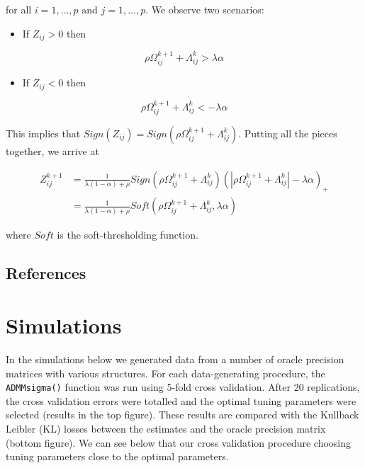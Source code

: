 \documentclass[12pt,]{book}
\providecommand{\tightlist}{%
  \setlength{\itemsep}{0pt}\setlength{\parskip}{0pt}}
\theoremstyle{definition}
\theoremstyle{definition}
\theoremstyle{definition}
\theoremstyle{remark}
\begin{document}
for all \(i = 1,..., p\) and \(j = 1,..., p\). We observe two scenarios:

\begin{itemize}
\tightlist
\item
  If \(Z_{ij} > 0\) then
\end{itemize}

\[ \rho\Omega_{ij}^{k + 1} + \Lambda_{ij}^{k} > \lambda\alpha \]

\begin{itemize}
\tightlist
\item
  If \(Z_{ij} < 0\) then
\end{itemize}

\[ \rho\Omega_{ij}^{k + 1} + \Lambda_{ij}^{k} < -\lambda\alpha \]

This implies that
\(Sign(Z_{ij}) = Sign(\rho\Omega_{ij}^{k + 1} + \Lambda_{ij}^{k})\).
Putting all the pieces together, we arrive at

\begin{align*}
Z_{ij}^{k + 1} &= \frac{1}{\lambda(1 - \alpha) + \rho}Sign\left(\rho\Omega_{ij}^{k + 1} + \Lambda_{ij}^{k}\right)\left( \left| \rho\Omega_{ij}^{k + 1} + \Lambda_{ij}^{k} \right| - \lambda\alpha \right)_{+} \\
&= \frac{1}{\lambda(1 - \alpha) + \rho}Soft\left(\rho\Omega_{ij}^{k + 1} + \Lambda_{ij}^{k}, \lambda\alpha\right)
\end{align*}

where \(Soft\) is the soft-thresholding function.

\newpage

\hypertarget{references}{%
\section{References}\label{references}}

\hypertarget{simulations}{%
\chapter{Simulations}\label{simulations}}

In the simulations below we generated data from a number of oracle
precision matrices with various structures. For each data-generating
procedure, the \texttt{ADMMsigma()} function was run using 5-fold cross
validation. After 20 replications, the cross validation errors were
totalled and the optimal tuning parameters were selected (results in the
top figure). These results are compared with the Kullback Leibler (KL)
losses between the estimates and the oracle precision matrix (bottom
figure). We can see below that our cross validation procedure choosing
tuning parameters close to the optimal parameters.
\end{document}
